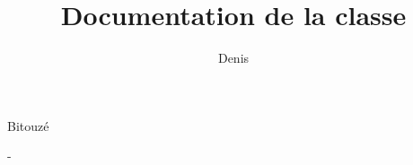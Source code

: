 \title[Documentation of the class \texorpdfstring{\yat}{yathesis}]{%
  Documentation de la classe \texorpdfstring{\yat}{yathesis}%
}
%
\subtitle[\version{\yathesisfileversion}]{\version{\yathesisfileversion}}
%
\author[denis.bitouze@univ-littoral.fr]{Denis}{Bitouzé}
%
\subject[LaTeX class whose basic purpose is to facilitate dissertations'
typesetting of theses prepared in France]{Classe LaTeX destinée à faciliter la
  rédaction des mémoires de thèses préparées en France}
%
%
\def\mysplit#1-#2-#3-{\def\myyear{#1}\def\mymonth{#2}\def\myday{#3}}
\def\splitdate#1{\expandafter\mysplit#1-}
\splitdate{\yathesisfiledate}

\date{\myday}{\mymonth}{\myyear}%
%
\maketitle[nofrontcover,frametitle={drop lifted shadow}]

